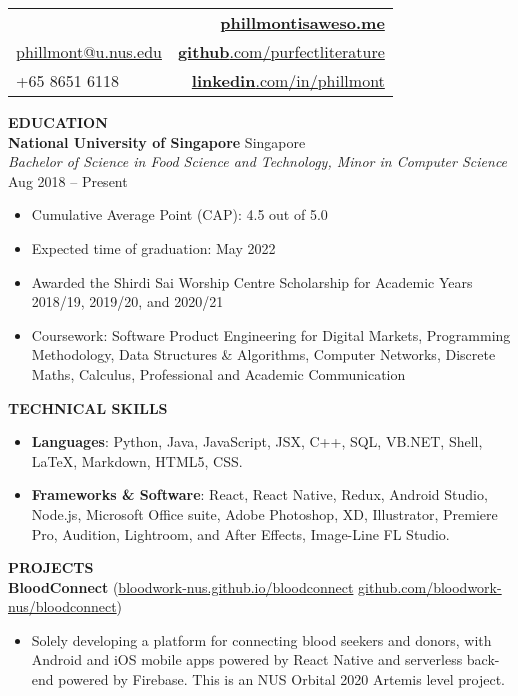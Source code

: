 \documentclass[a4paper, 11pt]{article}
\makeatletter
\newcommand{\interspace}{\vspace{7pt}}
\newcommand{\name}{Phillmont Muktar}
\newcommand{\cname}{\begin{CJK*}{UTF8}{zhsong}郑传期\end{CJK*}}
\newcommand{\tel}{+65 8651 6118}
\newcommand{\email}{\href{mailto:phillmont@u.nus.edu}{phillmont@u.nus.edu}}
\newcommand{\linkedin}{\href{http://linkedin.com/in/phillmont}{\textbf{linkedin}.com/in/phillmont}}
\newcommand{\github}{\href{http://github.com/purfectliterature}{\textbf{github}.com/purfectliterature}}
\newcommand{\mysite}{\href{https://phillmontisaweso.me}{\textbf{phillmontisaweso.me}}}
\makeatother
\begin{document}
	\sffamily
	
	\begin{tabularx}{\linewidth}{@{}X r@{}}
		{\Large \textbf{\name, \cname}} & \mysite\\ 
		\email & \github\\
		\tel & \linkedin
	\end{tabularx}

	\interspace

	\textbf{\large EDUCATION} \hrulefill \\
	\textbf{National University of Singapore} \hfill Singapore\\
	\textit{Bachelor of Science in Food Science and Technology, Minor in Computer Science} \hfill Aug 2018 -- Present
	\begin{itemize}[leftmargin=*, noitemsep, topsep=0pt]
		\item Cumulative Average Point (CAP): 4.5 out of 5.0
		\item Expected time of graduation: May 2022
		\item Awarded the Shirdi Sai Worship Centre Scholarship for Academic Years 2018/19, 2019/20, and 2020/21
		\item Coursework: Software Product Engineering for Digital Markets, Programming Methodology, Data Structures \& Algorithms, Computer Networks, Discrete Maths, Calculus, Professional and Academic Communication
	\end{itemize}
	
	\interspace
	
	\textbf{\large TECHNICAL SKILLS} \hrulefill
	\begin{itemize}[leftmargin=*, noitemsep, topsep=0pt]
		\item \textbf{Languages}: Python, Java, JavaScript, JSX, C++, SQL, VB.NET, Shell, \LaTeX, Markdown, HTML5, CSS.
		\item \textbf{Frameworks \& Software}: React, React Native, Redux, Android Studio, Node.js, Microsoft Office suite, Adobe Photoshop, XD, Illustrator, Premiere Pro, Audition, Lightroom, and After Effects, Image-Line FL Studio.
	\end{itemize}

	\interspace
	
	\textbf{\large PROJECTS} \hrulefill \\
	\textbf{BloodConnect} (\href{https://bloodwork-nus.github.io/bloodconnect/}{bloodwork-nus.github.io/bloodconnect} \textbar\space \href{https://github.com/bloodwork-nus/bloodconnect}{github.com/bloodwork-nus/bloodconnect})
	\begin{itemize}[leftmargin=*, noitemsep, topsep=0pt]
		\item Solely developing a platform for connecting blood seekers and donors, with Android and iOS mobile apps powered by React Native and serverless back-end powered by Firebase. This is an NUS Orbital 2020 Artemis level project.
	\end{itemize}
	
\end{document}
